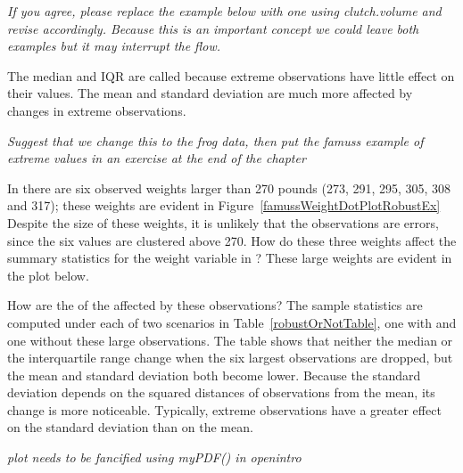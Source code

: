 \begin{doublespace}
\textit{If you agree, please replace the example below with one using clutch.volume and revise accordingly.  Because this is an important concept we could  leave both examples but it may interrupt the flow.}

The median and IQR are called  because extreme observations have little effect on their values. The mean and standard deviation are much more affected by changes in extreme observations.

\textit{Suggest that we change this to the frog data, then put the famuss example of extreme values in an exercise at the end of the chapter}

In  there are six observed weights larger than 270 pounds (273, 291, 295, 305, 308 and 317); these weights are evident in Figure~\ref{famussWeightDotPlotRobustEx} Despite the size of these weights, it is unlikely that the observations are errors, since the six values are clustered above 270. How do these three weights affect the summary statistics for the weight variable in ?  These large weights are evident in the plot below.

How are the  of the  affected by these observations?  The sample statistics are computed under each of two scenarios in Table~\ref{robustOrNotTable},  one with and one without these large observations. The table shows that neither the median or the interquartile range change when the six largest observations are dropped, but the mean and standard deviation both become lower.  Because the standard deviation depends on the squared distances of observations from the mean, its change is more noticeable.  Typically, extreme observations have a greater effect on the standard deviation than on the mean.

\textit{plot needs to be fancified using myPDF() in openintro}


\end{doublespace}
